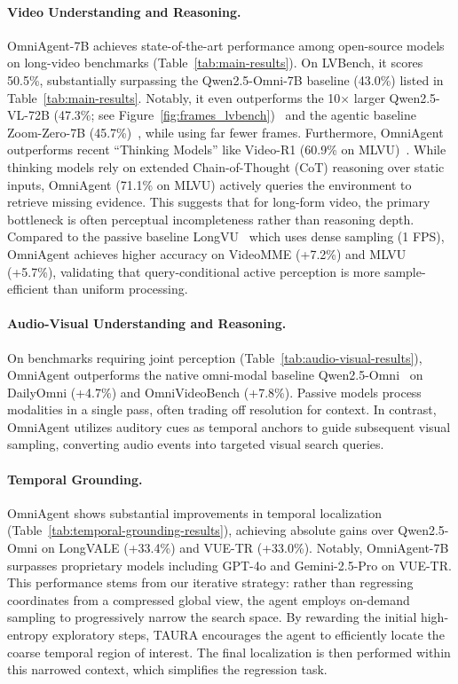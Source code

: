 \documentclass{article}
\theoremstyle{plain}
\theoremstyle{definition}
\theoremstyle{remark}
\begin{document}
\paragraph{Video Understanding and Reasoning.}
OmniAgent-7B achieves state-of-the-art performance among open-source models on long-video benchmarks (Table~\ref{tab:main-results}). On LVBench, it scores 50.5\%, substantially surpassing the Qwen2.5-Omni-7B baseline (43.0\%) listed in Table~\ref{tab:main-results}. Notably, it even outperforms the 10$\times$ larger Qwen2.5-VL-72B (47.3\%; see Figure~\ref{fig:frames_lvbench})~\cite{qwen2.5vl} and the agentic baseline Zoom-Zero-7B (45.7\%)~\cite{zoomzero}, while using far fewer frames.
Furthermore, OmniAgent outperforms recent ``Thinking Models'' like Video-R1 (60.9\% on MLVU)~\cite{feng2025video}. While thinking models rely on extended Chain-of-Thought (CoT) reasoning over static inputs, OmniAgent (71.1\% on MLVU) actively queries the environment to retrieve missing evidence. This suggests that for long-form video, the primary bottleneck is often perceptual incompleteness rather than reasoning depth.
Compared to the passive baseline LongVU~\cite{shen2024longvu} which uses dense sampling (1 FPS), OmniAgent achieves higher accuracy on VideoMME (+7.2\%) and MLVU (+5.7\%), validating that query-conditional active perception is more sample-efficient than uniform processing.

\paragraph{Audio-Visual Understanding and Reasoning.}
On benchmarks requiring joint perception (Table~\ref{tab:audio-visual-results}), OmniAgent outperforms the native omni-modal baseline Qwen2.5-Omni~\cite{qwen2.5omni} on DailyOmni (+4.7\%) and OmniVideoBench (+7.8\%). Passive models process modalities in a single pass, often trading off resolution for context. In contrast, OmniAgent utilizes auditory cues as temporal anchors to guide subsequent visual sampling, converting audio events into targeted visual search queries.

\paragraph{Temporal Grounding.}
OmniAgent shows substantial improvements in temporal localization (Table~\ref{tab:temporal-grounding-results}), achieving absolute gains over Qwen2.5-Omni on LongVALE (+33.4\%) and VUE-TR (+33.0\%). Notably, OmniAgent-7B surpasses proprietary models including GPT-4o and Gemini-2.5-Pro on VUE-TR. This performance stems from our iterative strategy: rather than regressing coordinates from a compressed global view, the agent employs on-demand sampling to progressively narrow the search space. By rewarding the initial high-entropy exploratory steps, TAURA encourages the agent to efficiently locate the coarse temporal region of interest. The final localization is then performed within this narrowed context, which simplifies the regression task.
\end{document}
